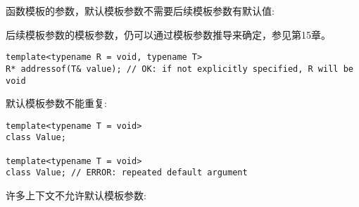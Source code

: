 函数模板的参数，默认模板参数不需要后续模板参数有默认值:

\begin{tcolorbox}[colback=webgreen!5!white,colframe=webgreen!75!black]
\hspace*{0.75cm}后续模板参数的模板参数，仍可以通过模板参数推导来确定，参见第15章。
\end{tcolorbox}

\begin{lstlisting}[style=styleCXX]
template<typename R = void, typename T>
R* addressof(T& value); // OK: if not explicitly specified, R will be void
\end{lstlisting}

默认模板参数不能重复:

\begin{lstlisting}[style=styleCXX]
template<typename T = void>
class Value;

template<typename T = void>
class Value; // ERROR: repeated default argument
\end{lstlisting}

许多上下文不允许默认模板参数:

